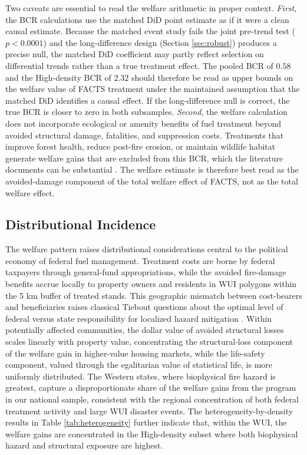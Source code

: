 \documentclass[12pt, letterpaper]{article}
\begin{document}
Two caveats are essential to read the welfare arithmetic in proper context. \textit{First}, the BCR calculations use the matched DiD point estimate as if it were a clean causal estimate. Because the matched event study fails the joint pre-trend test ($p < 0.0001$) and the long-difference design (Section \ref{sec:robust}) produces a precise null, the matched DiD coefficient may partly reflect selection on differential trends rather than a true treatment effect. The pooled BCR of $0.58$ and the High-density BCR of $2.32$ should therefore be read as upper bounds on the welfare value of FACTS treatment under the maintained assumption that the matched DiD identifies a causal effect. If the long-difference null is correct, the true BCR is closer to zero in both subsamples. \textit{Second}, the welfare calculation does not incorporate ecological or amenity benefits of fuel treatment beyond avoided structural damage, fatalities, and suppression costs. Treatments that improve forest health, reduce post-fire erosion, or maintain wildlife habitat generate welfare gains that are excluded from this BCR, which the literature documents can be substantial \citep{stephens2012}. The welfare estimate is therefore best read as the avoided-damage component of the total welfare effect of FACTS, not as the total welfare effect.

\subsection{Distributional Incidence}

The welfare pattern raises distributional considerations central to the political economy of federal fuel management. Treatment costs are borne by federal taxpayers through general-fund appropriations, while the avoided fire-damage benefits accrue locally to property owners and residents in WUI polygons within the 5 km buffer of treated stands. This geographic mismatch between cost-bearers and beneficiaries raises classical Tiebout questions about the optimal level of federal versus state responsibility for localized hazard mitigation \citep{tiebout1956}. Within potentially affected communities, the dollar value of avoided structural losses scales linearly with property value, concentrating the structural-loss component of the welfare gain in higher-value housing markets, while the life-safety component, valued through the egalitarian value of statistical life, is more uniformly distributed. The Western states, where biophysical fire hazard is greatest, capture a disproportionate share of the welfare gains from the program in our national sample, consistent with the regional concentration of both federal treatment activity and large WUI disaster events. The heterogeneity-by-density results in Table \ref{tab:heterogeneity} further indicate that, within the WUI, the welfare gains are concentrated in the High-density subset where both biophysical hazard and structural exposure are highest.
\end{document}
